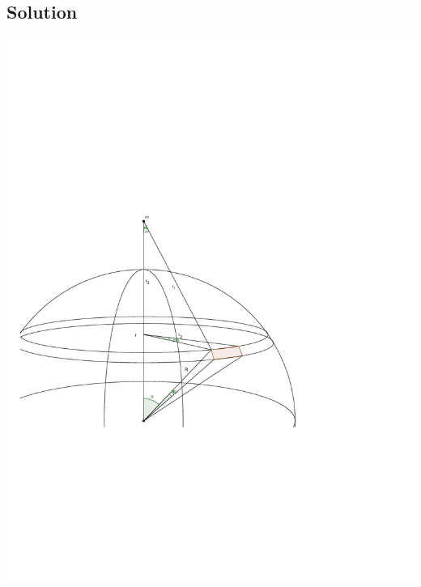 \documentclass[solutions]{esg8012pset}
\begin{document}
\subsection{Solution}
  \begin{center}\includegraphics[width=.5\textwidth]{2009-10-02_Diagram_2_1}\end{center}
\end{document}
